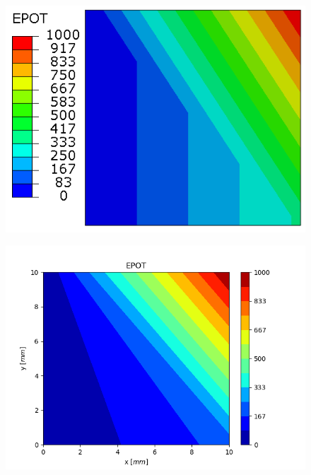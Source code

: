 \documentclass[11pt]{article}
\begin{document}
\begin{figure}[H]
	\centering
	\begin{minipage}{.5\textwidth}
		\centering
		\includegraphics[width=1\linewidth]{E1EPOT.png}
		\label{E1EPOT}
	\end{minipage}%
	\begin{minipage}{.5\textwidth}
		\centering
		\includegraphics[width=1\linewidth]{E1EPOT_IGA.png}
		\label{E1EPOT_IGA}
	\end{minipage}
\end{figure}
\end{document}
